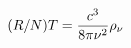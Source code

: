 \documentclass[preview]{standalone}
\begin{document}
\begin{align*}
(R / N) T = { c^{3} \over 8\pi\nu^{2} } \rho_{\nu}
\end{align*}
\end{document}
